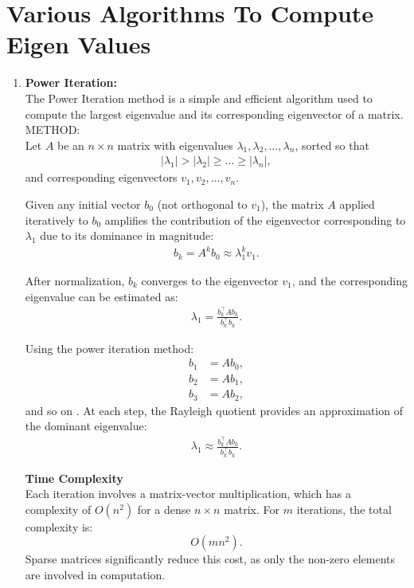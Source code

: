 \documentclass[journal]{IEEEtran}
\begin{document}
\section{Various Algorithms To Compute Eigen Values}
\begin{enumerate}
    \item \textbf{Power Iteration:} \\
    The Power Iteration method is a simple and efficient algorithm used to compute the largest eigenvalue and its corresponding eigenvector of a matrix. \\
    METHOD: \\
    Let $A$ be an $n \times n$ matrix with eigenvalues $\lambda_1, \lambda_2, \dots, \lambda_n$, sorted so that 
\begin{align}
|\lambda_1| > |\lambda_2| \geq \dots \geq |\lambda_n|,
\end{align}
and corresponding eigenvectors $v_1, v_2, \dots, v_n$.

Given any initial vector $b_0$ (not orthogonal to $v_1$), the matrix $A$ applied iteratively to $b_0$ amplifies the contribution of the eigenvector corresponding to $\lambda_1$ due to its dominance in magnitude:
\begin{align}
b_k = A^k b_0 \approx \lambda_1^k v_1.
\end{align}

After normalization, $b_k$ converges to the eigenvector $v_1$, and the corresponding eigenvalue can be estimated as:
\begin{align}
\lambda_1 = \frac{b_k^\top A b_k}{b_k^\top b_k}.
\end{align}

Using the power iteration method:
\begin{align}
b_1 & = A b_0, \\
b_2 & = A b_1, \\
b_3 & = A b_2, 
\end{align}
and so on .
At each step, the Rayleigh quotient provides an approximation of the dominant eigenvalue:
\begin{align}
\lambda_1 \approx \frac{b_k^\top A b_k}{b_k^\top b_k}.
\end{align}

\textbf{Time Complexity} \\
Each iteration involves a matrix-vector multiplication, which has a complexity of $O(n^2)$ for a dense $n \times n$ matrix.  
For $m$ iterations, the total complexity is:
\[
O(mn^2).
\]
Sparse matrices significantly reduce this cost, as only the non-zero elements are involved in computation.


\end{enumerate}
\end{document}
